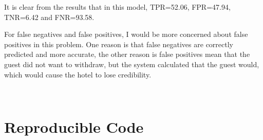 \documentclass{article}
\begin{document}
\begin{figure}[htbp]
\centering

%
%

\centering
\end{figure}

It is clear from the results that in this model, TPR=52.06, FPR=47.94, TNR=6.42 and FNR=93.58.

For false negatives and false positives, I would be more concerned about false positives in this problem. One reason is that false negatives are correctly predicted and more accurate, the other reason is false positives mean that the guest did not want to withdraw, but the system calculated that the guest would, which would cause the hotel to lose credibility.


\ 

\section{Reproducible Code}
\end{document}
